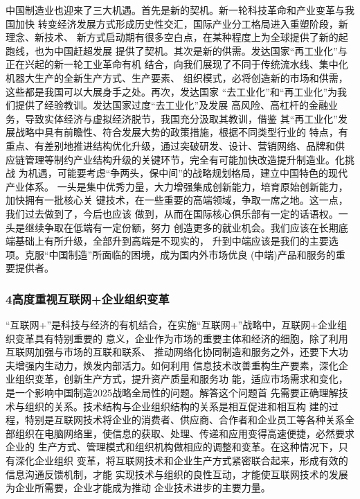 \documentclass[11pt]{ctexart}
\begin{document}
{{{{中国制造业也迎来了三大机遇。首先是新的契机。新一轮科技革命和产业变革与我国加快
转变经济发展方式形成历史性交汇，国际产业分工格局进入重塑阶段，新理念、新技术、
新方式启动期有很多空白点，在某种程度上为全球提供了新的起跑线，也为中国赶超发展
提供了契机。其次是新的供需。发达国家“再工业化”与正在兴起的新一轮工业革命有机
结合，向我们展现了不同于传统流水线、集中化机器大生产的全新生产方式、生产要素、
组织模式，必将创造新的市场和供需，这些都是我国可以大展身手之处。再次，发达国家
“去工业化”和“再工业化”为我们提供了经验教训。发达国家过度“去工业化”及发展
高风险、高杠杆的金融业务，导致实体经济与虚拟经济脱节，我国充分汲取其教训，借鉴
其“再工业化”发展战略中具有前瞻性、符合发展大势的政策措施，根据不同类型行业的
特点，有重点、有差别地推进结构优化升级，通过突破研发、设计、营销网络、品牌和供
应链管理等制约产业结构升级的关键环节，完全有可能加快改造提升制造业。化挑战
为机遇，可能要考虑“争两头，保中间”的战略规划格局，建立中国特色的现代产业体系。
一头是集中优秀力量，大力增强集成创新能力，培育原始创新能力，加快拥有一批核心关
键技术，在一些重要的高端领域，争取一席之地。这一点，我们过去做到了，今后也应该
做到，从而在国际核心俱乐部有一定的话语权。一头是继续争取在低端有一定份额，努力
创造更多的就业机会。我们应该在长期底端基础上有所升级，全部升到高端是不现实的，
升到中端应该是我们的主要选项。克服“中国制造”所面临的困境，成为国内外市场优良
(中端)产品和服务的重要提供者。

\subsubsection{4高度重视互联网+企业组织变革}
\label{sec:orgfec73b4}

“互联网+”是科技与经济的有机结合，在实施“互联网+”战略中，互联网+企业组织变革具有特别重要的
意义，企业作为市场的重要主体和经济的细胞，除了利用互联网加强与市场的互联和联系、
推动网络化协同制造和服务之外，还要下大功夫增强内生动力，焕发内部活力。如何利用
信息技术改善重构生产要素，深化企业组织变革，创新生产方式，提升资产质量和服务功
能，适应市场需求和变化，是一个影响中国制造2025战略全局性的问题。解答这个问题首
先需要正确理解技术与组织的关系。技术结构与企业组织结构的关系是相互促进和相互构
建的过程，特别是互联网技术将企业的消费者、供应商、合作者和企业员工等各种关系全
部组织在电脑网络里，使信息的获取、处理、传递和应用变得高速便捷，必然要求企业的
生产方式、管理模式和组织机构做相应的调整和变革。在这种情况下，只有深化企业组织
变革，将互联网技术和企业生产方式紧密联合起来，形成有效的信息沟通反馈机制，才能
实现技术与组织的良性互动，才能使互联网技术的发展为企业所需要，企业才能成为推动
企业技术进步的主要力量。

}}}}
\end{document}
